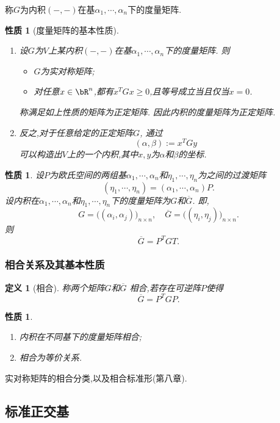 \documentclass{article}
\newtheorem{proposition}[theorem]{性质}  %
\newtheorem{definition}[theorem]{定义}
\renewcommand{\blue }[1]{{\textcolor[rgb]{0,0,1}{#1}}}
\begin{document}
称$G$为内积$(-,-)$在基$\alpha_1,\cdots,\alpha_n$下的\blue{度量矩阵}.

\begin{proposition}[度量矩阵的基本性质]
\begin{enumerate}
\item 设$G$为$V$上某内积$(-,-)$在基$\alpha_1,\cdots,\alpha_n$下的度量矩阵. 则
\begin{itemize}
\item $G$为实对称矩阵;
\item 对任意$x\in\bR^n$,都有$x^TGx\geq0$,且等号成立当且仅当$x=0$.
\end{itemize}
称满足如上性质的矩阵为\blue{正定矩阵}.
因此内积的度量矩阵为正定矩阵.
\item 反之,对于任意给定的正定矩阵$G$, 通过
\[(\alpha,\beta):=x^TGy\]
可以构造出$V$上的一个内积,其中$x,y$为$\alpha$和$\beta$的坐标.
\end{enumerate}
\end{proposition}
\begin{proposition}
设$P$为欧氏空间的两组基$\alpha_1,\cdots,\alpha_n$和$\eta_1,\cdots,\eta_n$为之间的过渡矩阵
\[(\eta_1,\cdots,\eta_n) = (\alpha_1,\cdots,\alpha_n)P.\]
设内积在$\alpha_1,\cdots,\alpha_n$和$\eta_1,\cdots,\eta_n$下的度量矩阵为$G$和$\overline{G}$. 即,
\[G=\Big((\alpha_i,\alpha_j)\Big)_{n\times n},\quad \overline{G}=\Big((\eta_i,\eta_j)\Big)_{n\times n}.\]
则
\[\overline{G}=P^TGT.\]
\end{proposition}

\subsubsection{相合关系及其基本性质}
\begin{definition}[相合]
称两个矩阵$G$和$\overline{G}$ \blue{相合},若存在可逆阵$P$使得
\[\overline{G}=P^TGP.\]
\end{definition}
\begin{proposition}
\begin{enumerate}
\item 内积在不同基下的度量矩阵相合;
\item 相合为等价关系.
\end{enumerate}
\end{proposition}
实对称矩阵的相合分类,以及相合标准形(第八章).


\subsection{标准正交基}
\end{document}
